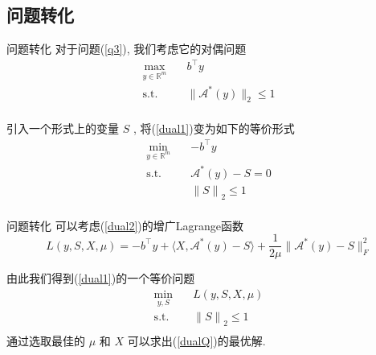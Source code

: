 \documentclass[slidestop, compress, mathserif, UTF8]{beamer}
\numberwithin{equation}{section}                                        %
\begin{document}
        \subsection{问题转化}
            \begin{frame}[t]{问题转化}
                对于问题(\ref{q3}), 我们考虑它的对偶问题
                \begin{equation}
                    \begin{split}\label{dual1}
                        \max_{y \in \mathbb{R}^{m}} \quad
                            & b^\top y\\
                        \text{s.t.} \quad
                            & \lVert{\mathcal{A}^*(y)}\rVert_2 \le 1\\
                    \end{split}
                \end{equation}

                引入一个形式上的变量 $S$ , 将(\ref{dual1})变为如下的等价形式
                \begin{equation}
                    \begin{split}\label{dual2}
                        \min_{y \in \mathbb{R}^{m}} \quad
                            & -b^\top y\\
                        \text{s.t.} \quad
                            & \mathcal{A}^*(y) - S = 0\\
                            & {\lVert{S}\rVert}_2 \le 1\\
                    \end{split}
                \end{equation}
            \end{frame}
            \begin{frame}[t]{问题转化}
                可以考虑(\ref{dual2})的增广Lagrange函数
                \begin{equation}\label{Lag}
                        L(y, S, X, \mu)
                    =	-b^\top y + \langle{X, \mathcal{A}^*(y) - S}\rangle + \frac{1}{2\mu} \lVert{\mathcal{A}^*(y) - S}\rVert^2_F
                \end{equation}

                由此我们得到(\ref{dual1})的一个等价问题
                \begin{equation}
                    \begin{split}\label{dualQ}
                        \min_{y,S} \quad
                            & L(y, S, X, \mu)\\
                        \text{s.t.} \quad
                            & {\lVert{S}\rVert}_2 \le 1\\
                    \end{split}
                \end{equation}
                通过选取最佳的 $\mu$ 和 $X$ 可以求出(\ref{dualQ})的最优解.
            \end{frame}
\end{document}
